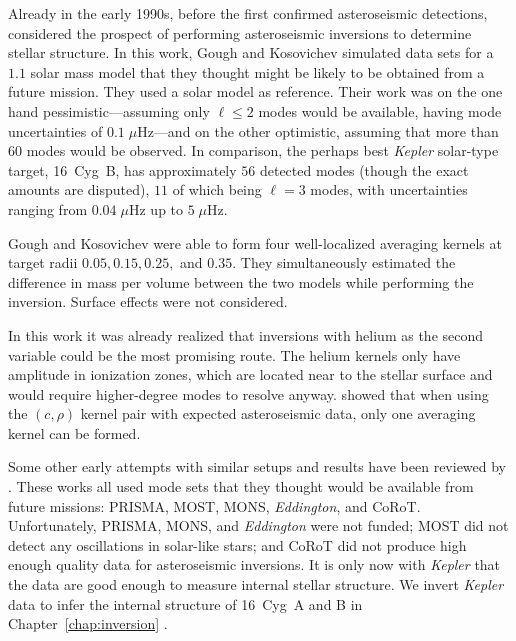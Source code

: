 Already in the early 1990s, before the first confirmed asteroseismic detections, \citet{1993ASPC...40..541G} considered the prospect of performing asteroseismic inversions to determine stellar structure. 
In this work, Gough and Kosovichev simulated data sets for a $1.1$ solar mass model that they thought might be likely to be obtained from a future mission. %
They used a solar model as reference. 
Their work was on the one hand pessimistic---assuming only ${\ell\leq 2}$ modes would be available, having mode uncertainties of ${0.1\;\mu\text{Hz}}$---and on the other optimistic, assuming that more than $60$ modes would be observed. 
In comparison, the perhaps best \emph{Kepler} solar-type target, 16~Cyg~B, has approximately $56$ detected modes (though the exact amounts are disputed), $11$ of which being ${\ell=3}$ modes, with uncertainties ranging from ${0.04\;\mu\text{Hz}}$ up to ${5\;\mu\text{Hz}}$. 

Gough and Kosovichev were able to form four well-localized averaging kernels at target radii $0.05, 0.15, 0.25,$ and $0.35$. 
They simultaneously estimated the difference in mass per volume between the two models while performing the inversion. 
Surface effects were not considered. 

In this work it was already realized that inversions with helium as the second variable could be the most promising route. 
The helium kernels only have amplitude in ionization zones, which are located near to the stellar surface and would require higher-degree modes to resolve anyway. 
\citet{2001ESASP.464..407B} showed that when using the ${(c,\rho)}$ kernel pair with expected asteroseismic data, only one averaging kernel can be formed. 

Some other early attempts with similar setups and results have been reviewed by \citet{2003Ap&SS.284..153B}. 
These works all used mode sets that they thought would be available from future missions: PRISMA, MOST, MONS, \emph{Eddington}, and CoRoT. 
Unfortunately, PRISMA, MONS, and \emph{Eddington} were not funded; MOST did not detect any oscillations in solar-like stars; and CoRoT did not produce high enough quality data for asteroseismic inversions. 
It is only now with \emph{Kepler} that the data are good enough to measure internal stellar structure. 
We invert \emph{Kepler} data to infer the internal structure of 16~Cyg~A and B in Chapter~\ref{chap:inversion} \citep{2017ApJ...851...80B}. 

